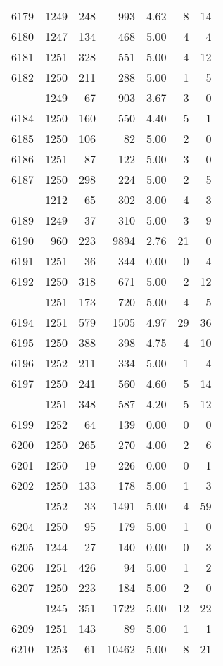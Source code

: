 \documentclass[
]{article}
\begin{document}
\begin{table}
\begin{tabular}[t]{lrrrrrr}
6179 & 1249 & 248 & 993 & 4.62 & 8 & 14\\
6180 & 1247 & 134 & 468 & 5.00 & 4 & 4\\
6181 & 1251 & 328 & 551 & 5.00 & 4 & 12\\
6182 & 1250 & 211 & 288 & 5.00 & 1 & 5\\
\addlinespace
6183 & 1249 & 67 & 903 & 3.67 & 3 & 0\\
6184 & 1250 & 160 & 550 & 4.40 & 5 & 1\\
6185 & 1250 & 106 & 82 & 5.00 & 2 & 0\\
6186 & 1251 & 87 & 122 & 5.00 & 3 & 0\\
6187 & 1250 & 298 & 224 & 5.00 & 2 & 5\\
\addlinespace
6188 & 1212 & 65 & 302 & 3.00 & 4 & 3\\
6189 & 1249 & 37 & 310 & 5.00 & 3 & 9\\
6190 & 960 & 223 & 9894 & 2.76 & 21 & 0\\
6191 & 1251 & 36 & 344 & 0.00 & 0 & 4\\
6192 & 1250 & 318 & 671 & 5.00 & 2 & 12\\
\addlinespace
6193 & 1251 & 173 & 720 & 5.00 & 4 & 5\\
6194 & 1251 & 579 & 1505 & 4.97 & 29 & 36\\
6195 & 1250 & 388 & 398 & 4.75 & 4 & 10\\
6196 & 1252 & 211 & 334 & 5.00 & 1 & 4\\
6197 & 1250 & 241 & 560 & 4.60 & 5 & 14\\
\addlinespace
6198 & 1251 & 348 & 587 & 4.20 & 5 & 12\\
6199 & 1252 & 64 & 139 & 0.00 & 0 & 0\\
6200 & 1250 & 265 & 270 & 4.00 & 2 & 6\\
6201 & 1250 & 19 & 226 & 0.00 & 0 & 1\\
6202 & 1250 & 133 & 178 & 5.00 & 1 & 3\\
\addlinespace
6203 & 1252 & 33 & 1491 & 5.00 & 4 & 59\\
6204 & 1250 & 95 & 179 & 5.00 & 1 & 0\\
6205 & 1244 & 27 & 140 & 0.00 & 0 & 3\\
6206 & 1251 & 426 & 94 & 5.00 & 1 & 2\\
6207 & 1250 & 223 & 184 & 5.00 & 2 & 0\\
\addlinespace
6208 & 1245 & 351 & 1722 & 5.00 & 12 & 22\\
6209 & 1251 & 143 & 89 & 5.00 & 1 & 1\\
6210 & 1253 & 61 & 10462 & 5.00 & 8 & 21\\

\end{tabular}
\end{table}
\end{document}
